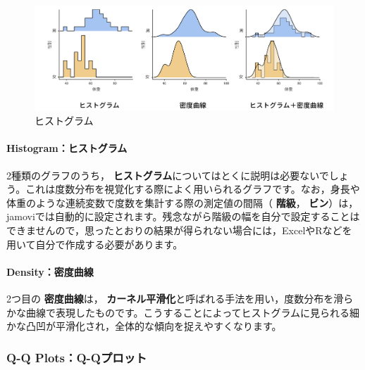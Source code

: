 \documentclass[
  12pt,
  a5jpaper,
  lualatex, ja=standard]{bxjsbook}
\renewcommand{\emph}[1]{\textbf{\color{emph} #1}}
\begin{document}
\begin{figure}[!ht]

{\centering \includegraphics[width=1\linewidth]{images/exploration/Exploration-descriptives-plots-histograms} 

}

\caption{ヒストグラム}\label{fig:Exploration-descriptives-plots-histograms}
\end{figure}

\hypertarget{histogramux30d2ux30b9ux30c8ux30b0ux30e9ux30e0}{%
\paragraph*{Histogram：ヒストグラム}\label{histogramux30d2ux30b9ux30c8ux30b0ux30e9ux30e0}}

2種類のグラフのうち，\emph{ヒストグラム}についてはとくに説明は必要ないでしょう。これは度数分布を視覚化する際によく用いられるグラフです。なお，身長や体重のような連続変数で度数を集計する際の測定値の間隔（\emph{階級}，\emph{ビン}）は，jamoviでは自動的に設定されます。残念ながら階級の幅を自分で設定することはできませんので，思ったとおりの結果が得られない場合には，ExcelやRなどを用いて自分で作成する必要があります。

\hypertarget{densityux5bc6ux5ea6ux66f2ux7dda}{%
\paragraph*{Density：密度曲線}\label{densityux5bc6ux5ea6ux66f2ux7dda}}

2つ目の\emph{密度曲線}は，\emph{カーネル平滑化}と呼ばれる手法を用い，度数分布を滑らかな曲線で表現したものです。こうすることによってヒストグラムに見られる細かな凸凹が平滑化され，全体的な傾向を捉えやすくなります。

\hypertarget{subsubsub:exp-plots-qq}{%
\subsubsection*{Q-Q Plots：Q-Qプロット}\label{subsubsub:exp-plots-qq}}
\end{document}
